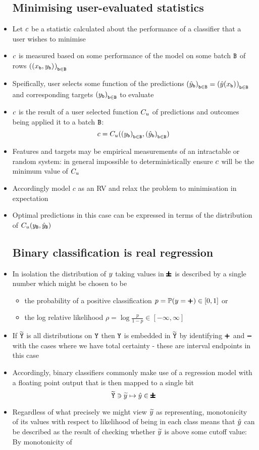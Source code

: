 \documentclass{article}
\begin{document}
\begin{itemize}
      \subsection{Minimising user-evaluated statistics}
  \item
    Let ${c}$ be a statistic calculated about the performance of a classifier that a user wishes to minimise
  \item
    ${c}$ is measured based on some performance of the model on some batch ${\texttt{B}}$ of rows $\ENMB[(\Feat_\Ib,\Targ_\Ib)][]$
  \item
    Speifically, user selects some function of the predictions $\ENMB[\Pred]=\ENMB[\Pred(\Feat_\Ib)][]$ and corresponding targets $\ENMB[\Targ]$ to evaluate
  \item
    ${c}$ is the result of a user selected function $\SCORE_{\Usr}$ of predictions and outcomes being applied it to a batch ${\texttt{B}}$:
      $$
      \Score=\SCORE_{\Usr}(\ENMB[\Targ],\ENMB[\Pred])
      $$
    \item
      Features and targets may be empirical measurements of an intractable or random system: in general impossible to deterministically ensure ${c}$ will be the minimum value of $\SCORE_{\Usr}$
    \item
      Accordingly model $c$ as an RV and relax the problem to minimisation in expectation
    \item
      Optimal predictions in this case can be expressed in terms of the distribution of $\REST[\SCORE][\Usr](\REST[\Targ],\REST[\Pred])$
\subsection{Binary classification is real regression}
  \item
    In isolation the distribution of $\Targ$ taking values in $\pmb{\pmb\pm}$ is described by a single number which might be chosen to be
    \begin{itemize}
      \item
        the probability of a positive classification $p=\Prob(\Targ=\POS)\in[0,1]$ or
      \item
        the log relative likelihood $\rho=\log\frac{p}{1-p}\in[-\infty,\infty]$
    \end{itemize}
  \item
    If $\OUTPR$ is all distributions on $\OUT$ then $\OUT$ is embedded in $\OUTPR$ by identifying $\pmb+$ and $\pmb-$ with the cases where we have total certainty - these are interval endpoints in this case
    \item
      Accordingly, binary classifiers commonly make use of a regression model with a floating point output that is then mapped to a single bit
      $$
      \OUTPR\ni\Predsmooth\mapsto\Pred\in\TWO
      $$
    \item
      Regardless of what precisely we might view $\widetilde{y}$ as representing, monotonicity of its values with respect to likelihood of being in each class means that ${\hat{y}}$ can be described as the result of checking whether $\widetilde{y}$ is above some cutoff value:
      By monotonicity of 

\end{itemize}
\end{document}
